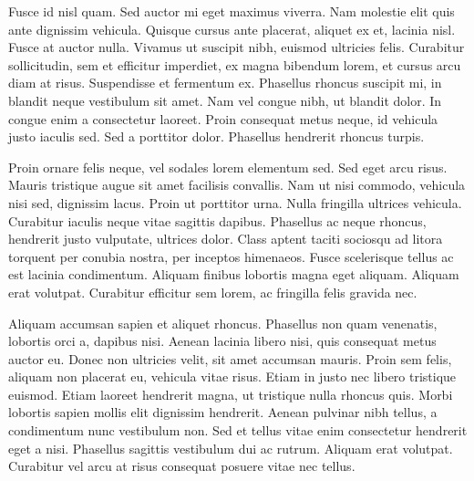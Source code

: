 	Fusce id nisl quam. Sed auctor mi eget maximus viverra. Nam molestie elit quis ante dignissim vehicula. Quisque cursus ante placerat, aliquet ex et, lacinia nisl. Fusce at auctor nulla. Vivamus ut suscipit nibh, euismod ultricies felis. Curabitur sollicitudin, sem et efficitur imperdiet, ex magna bibendum lorem, et cursus arcu diam at risus. Suspendisse et fermentum ex. Phasellus rhoncus suscipit mi, in blandit neque vestibulum sit amet. Nam vel congue nibh, ut blandit dolor. In congue enim a consectetur laoreet. Proin consequat metus neque, id vehicula justo iaculis sed. Sed a porttitor dolor. Phasellus hendrerit rhoncus turpis.
	
	Proin ornare felis neque, vel sodales lorem elementum sed. Sed eget arcu risus. Mauris tristique augue sit amet facilisis convallis. Nam ut nisi commodo, vehicula nisi sed, dignissim lacus. Proin ut porttitor urna. Nulla fringilla ultrices vehicula. Curabitur iaculis neque vitae sagittis dapibus. Phasellus ac neque rhoncus, hendrerit justo vulputate, ultrices dolor. Class aptent taciti sociosqu ad litora torquent per conubia nostra, per inceptos himenaeos. Fusce scelerisque tellus ac est lacinia condimentum. Aliquam finibus lobortis magna eget aliquam. Aliquam erat volutpat. Curabitur efficitur sem lorem, ac fringilla felis gravida nec.
	
	Aliquam accumsan sapien et aliquet rhoncus. Phasellus non quam venenatis, lobortis orci a, dapibus nisi. Aenean lacinia libero nisi, quis consequat metus auctor eu. Donec non ultricies velit, sit amet accumsan mauris. Proin sem felis, aliquam non placerat eu, vehicula vitae risus. Etiam in justo nec libero tristique euismod. Etiam laoreet hendrerit magna, ut tristique nulla rhoncus quis. Morbi lobortis sapien mollis elit dignissim hendrerit. Aenean pulvinar nibh tellus, a condimentum nunc vestibulum non. Sed et tellus vitae enim consectetur hendrerit eget a nisi. Phasellus sagittis vestibulum dui ac rutrum. Aliquam erat volutpat. Curabitur vel arcu at risus consequat posuere vitae nec tellus.


